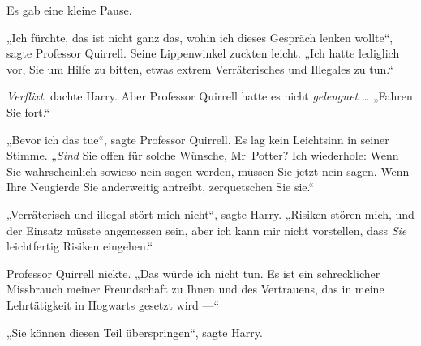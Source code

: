Es gab eine kleine Pause.

„Ich fürchte, das ist nicht ganz das, wohin ich dieses Gespräch lenken wollte“, sagte Professor Quirrell. Seine Lippenwinkel zuckten leicht.
„Ich hatte lediglich vor, Sie um Hilfe zu bitten, etwas extrem Verräterisches und Illegales zu tun.“

\emph{Verflixt}, dachte Harry. Aber Professor Quirrell hatte es nicht \emph{geleugnet} …
„Fahren Sie fort.“

„Bevor ich das tue“, sagte Professor Quirrell. Es lag kein Leichtsinn in seiner Stimme. „\emph{Sind} Sie offen für solche Wünsche, Mr~Potter? Ich wiederhole: Wenn Sie wahrscheinlich sowieso nein sagen werden, müssen Sie jetzt nein sagen. Wenn Ihre Neugierde Sie anderweitig antreibt, zerquetschen Sie sie.“

„Verräterisch und illegal stört mich nicht“, sagte Harry.
„Risiken stören mich, und der Einsatz müsste angemessen sein, aber ich kann mir nicht vorstellen, dass \emph{Sie} leichtfertig Risiken eingehen.“

Professor Quirrell nickte.
„Das würde ich nicht tun. Es ist ein schrecklicher Missbrauch meiner Freundschaft zu Ihnen und des Vertrauens, das in meine Lehrtätigkeit in Hogwarts gesetzt wird —“

„Sie können diesen Teil überspringen“, sagte Harry.

